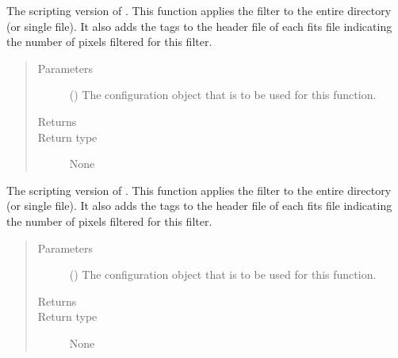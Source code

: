 \documentclass[letterpaper,10pt,english]{sphinxmanual}
\begin{document}
\begin{fulllineitems}
\label{\detokenize{docstrings/ifa_smeargle.masking.scripting:ifa_smeargle.masking.scripting.script_filter_exact_value}}
The scripting version of . This function
applies the filter to the entire directory (or single file). It
also adds the tags to the header file of each fits file
indicating the number of pixels filtered for this filter.
\begin{quote}\begin{description}
\item[{Parameters}] \leavevmode
{} () \textendash{} The configuration object that is to be used for this
function.

\item[{Returns}] \leavevmode


\item[{Return type}] \leavevmode
None

\end{description}\end{quote}

\end{fulllineitems}


\begin{fulllineitems}
\label{\detokenize{docstrings/ifa_smeargle.masking.scripting:ifa_smeargle.masking.scripting.script_filter_invalid_value}}
The scripting version of . This
function applies the filter to the entire directory (or single
file). It also adds the tags to the header file of each fits
file indicating the number of pixels filtered for this filter.
\begin{quote}\begin{description}
\item[{Parameters}] \leavevmode
{} () \textendash{} The configuration object that is to be used for this
function.

\item[{Returns}] \leavevmode


\item[{Return type}] \leavevmode
None

\end{description}\end{quote}

\end{fulllineitems}
\end{document}
